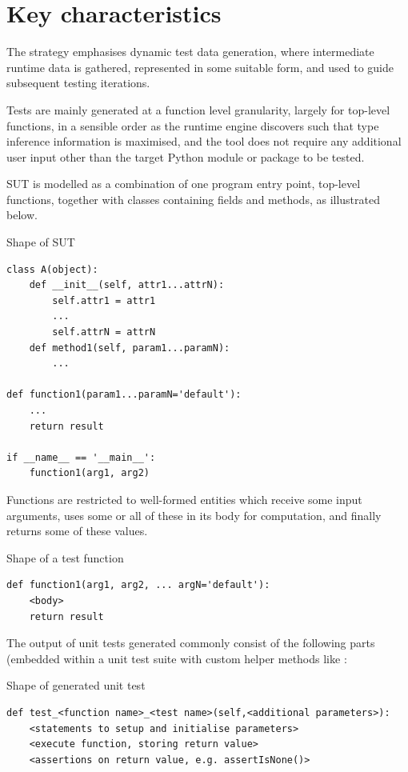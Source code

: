 \documentclass{icldt}
\numberwithin{equation}{section}       %
\begin{document}
{\section{Key characteristics}
The strategy emphasises dynamic test data generation, where intermediate runtime data is gathered, represented in some suitable form, and used to guide subsequent testing iterations.

Tests are mainly generated at a function level granularity, largely for top-level functions, in a sensible order as the runtime engine discovers such that type inference information is maximised, and the tool does not require any additional user input other than the target Python module or package to be tested.

SUT is modelled as a combination of one  program entry point, top-level functions, together with classes containing fields and methods, as illustrated below. 

\begin{listing}[H]
	\caption{Shape of SUT}
	\begin{verbatim}
class A(object):
	def __init__(self, attr1...attrN):
		self.attr1 = attr1
		...
		self.attrN = attrN
	def method1(self, param1...paramN):
		...

def function1(param1...paramN='default'):
	...
	return result

if __name__ == '__main__':
	function1(arg1, arg2)
	\end{verbatim}
	\label{lst:py-model-program}
\end{listing}

Functions are restricted to well-formed entities which receive some input arguments, uses some or all of these in its body for computation, and finally returns some of these values.
\begin{listing}[H]
	\caption{Shape of a test function}
	\begin{verbatim}
def function1(arg1, arg2, ... argN='default'):
	<body>
	return result
	\end{verbatim}
	\label{lst:py-model-function}
\end{listing}

The output of unit tests generated commonly consist of the following parts (embedded within a unit test suite with custom helper methods like :
\begin{listing}[H]
	\caption{Shape of generated unit test}
	\begin{verbatim}
def test_<function name>_<test name>(self,<additional parameters>):
	<statements to setup and initialise parameters>
	<execute function, storing return value>
	<assertions on return value, e.g. assertIsNone()>
	\end{verbatim}
	\label{lst:py-model-function}
\end{listing}

}
\end{document}
